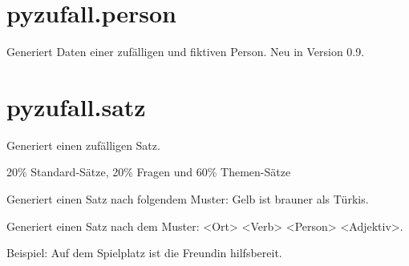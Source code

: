 \documentclass[a4paper,12pt,oneside]{sphinxmanual}
\begin{document}
\section{pyzufall.person}
\label{module:module-pyzufall.person}\label{module:pyzufall-person}

\begin{fulllineitems}
\label{module:pyzufall.person.Person}
Generiert Daten einer zufälligen und fiktiven Person.
Neu in Version 0.9.
\end{fulllineitems}



\section{pyzufall.satz}
\label{module:module-pyzufall.satz}\label{module:pyzufall-satz}

\begin{fulllineitems}
\label{module:pyzufall.satz.satz}
Generiert einen zufälligen Satz.

20\% Standard-Sätze, 20\% Fragen und 60\% Themen-Sätze

\end{fulllineitems}


\begin{fulllineitems}
\label{module:pyzufall.satz.satz_absurde_farbfunktion}
Generiert einen Satz nach folgendem Muster: Gelb ist brauner als Türkis.

\end{fulllineitems}


\begin{fulllineitems}
\label{module:pyzufall.satz.satz_adjektiv_am_ort}
Generiert einen Satz nach dem Muster: \textless{}Ort\textgreater{} \textless{}Verb\textgreater{} \textless{}Person\textgreater{} \textless{}Adjektiv\textgreater{}.

Beispiel: Auf dem Spielplatz ist die Freundin hilfsbereit.

\end{fulllineitems}
\end{document}
